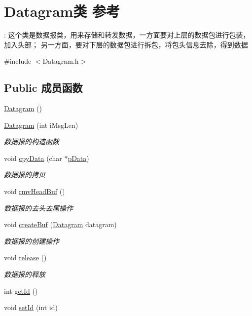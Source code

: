 \hypertarget{class_datagram}{}\section{Datagram类 参考}
\label{class_datagram}


\+: 这个类是数据报类，用来存储和转发数据，一方面要对上层的数据包进行包装，加入头部； 另一方面，要对下层的数据包进行拆包，将包头信息去除，得到数据  




{\ttfamily \#include $<$Datagram.\+h$>$}

\subsection*{Public 成员函数}
\begin{DoxyCompactItemize}
\item 
\hyperlink{class_datagram_a0935aec339a27b847c87dc6120613594}{Datagram} ()
\item 
\hyperlink{class_datagram_a4f1b9ef3e5a00a11e9b206665c5968dd}{Datagram} (int i\+Msg\+Len)
\begin{DoxyCompactList}\small\item\em 数据报的构造函数 \end{DoxyCompactList}\item 
void \hyperlink{class_datagram_afd6c80ab2f1f89bf6883bc552777668f}{cpy\+Data} (char $\ast$\hyperlink{class_datagram_a50bba5269b8d107e9be3147f28a9229c}{p\+Data})
\begin{DoxyCompactList}\small\item\em 数据报的拷贝 \end{DoxyCompactList}\item 
void \hyperlink{class_datagram_a92f5c858fa5f872bc7576346b932f77a}{rmv\+Head\+Buf} ()
\begin{DoxyCompactList}\small\item\em 数据报的去头去尾操作 \end{DoxyCompactList}\item 
void \hyperlink{class_datagram_ad54ae1c5f2522a9d6ab2145bfa33e7e4}{create\+Buf} (\hyperlink{class_datagram}{Datagram} datagram)
\begin{DoxyCompactList}\small\item\em 数据报的创建操作 \end{DoxyCompactList}\item 
void \hyperlink{class_datagram_ab3912f9748416eac75309fae598017c8}{release} ()
\begin{DoxyCompactList}\small\item\em 数据报的释放 \end{DoxyCompactList}\item 
int \hyperlink{class_datagram_aac2187f8896acdd5dc5424b8934d454a}{get\+Id} ()
\item 
void \hyperlink{class_datagram_a396a4dba1b8d973ce0d8951ca885872c}{set\+Id} (int id)
\end{DoxyCompactItemize}
